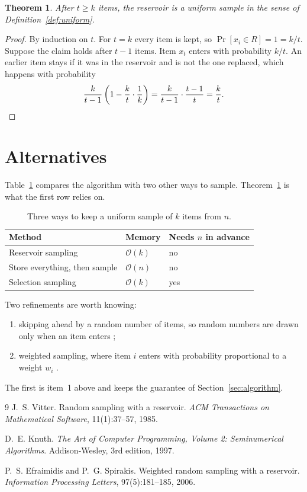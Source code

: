 \documentclass[11pt]{article}
\newtheorem{theorem}{Theorem}
\newcommand{\Oh}{\mathcal{O}}
\begin{document}
\begin{theorem}
\label{thm:uniform}
After $t \ge k$ items, the reservoir is a uniform sample in the sense of Definition~\ref{def:uniform}.
\end{theorem}

\begin{proof}
By induction on $t$. For $t = k$ every item is kept, so $\Pr[x_i \in R] = 1 = k/t$.
Suppose the claim holds after $t - 1$ items. Item $x_t$ enters with probability $k/t$.
An earlier item stays if it was in the reservoir and is not the one replaced, which happens with probability
\[
  \frac{k}{t-1}\left(1 - \frac{k}{t}\cdot\frac{1}{k}\right) = \frac{k}{t-1}\cdot\frac{t-1}{t} = \frac{k}{t}. \qedhere
\]
\end{proof}

\section{Alternatives}
\label{sec:alternatives}

Table~\ref{tab:alternatives} compares the algorithm with two other ways to sample.
Theorem~\ref{thm:uniform} is what the first row relies on.

\begin{table}[h]
  \centering
  \caption{Three ways to keep a uniform sample of $k$ items from $n$.}
  \label{tab:alternatives}
  \begin{tabular}{@{}lll@{}}
    \toprule
    Method & Memory & Needs $n$ in advance \\
    \midrule
    Reservoir sampling & $\Oh(k)$ & no \\
    Store everything, then sample & $\Oh(n)$ & no \\
    Selection sampling \cite{knuth1997art} & $\Oh(k)$ & yes \\
    \bottomrule
  \end{tabular}
\end{table}

Two refinements are worth knowing:
\begin{enumerate}
  \item skipping ahead by a random number of items, so random numbers are drawn only when an item enters \cite{vitter1985random};
  \item weighted sampling, where item $i$ enters with probability proportional to a weight $w_i$ \cite{efraimidis2006weighted}.
\end{enumerate}
The first is item~1 above and keeps the guarantee of Section~\ref{sec:algorithm}.

\begin{thebibliography}{9}
J.~S. Vitter.
\newblock Random sampling with a reservoir.
\newblock \emph{ACM Transactions on Mathematical Software}, 11(1):37--57, 1985.

D.~E. Knuth.
\newblock \emph{The Art of Computer Programming, Volume 2: Seminumerical Algorithms}.
\newblock Addison-Wesley, 3rd edition, 1997.

P.~S. Efraimidis and P.~G. Spirakis.
\newblock Weighted random sampling with a reservoir.
\newblock \emph{Information Processing Letters}, 97(5):181--185, 2006.
\end{thebibliography}
\end{document}
